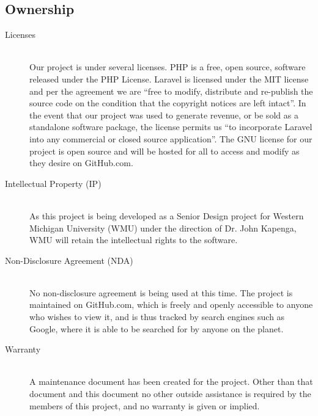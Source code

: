 \documentclass{report}
\begin{document}
\subsection*{Ownership}
\begin{description}
\item [Licenses] \hfill \\
Our project is under several licenses. PHP is a free, open source, software released under the PHP License. Laravel is licensed under the MIT license and per the agreement we are “free to modify, distribute and re-publish the source code on the condition that the copyright notices are left intact”. In the event that our project was used to generate revenue, or be sold as a standalone software package, the license permits us “to incorporate Laravel into any commercial or closed source application”. The GNU license for our project is open source and will be hosted for all to access and modify as they desire on GitHub.com.
\item [Intellectual Property (IP)] \hfill \\
As this project is being developed as a Senior Design project for Western Michigan University (WMU) under the direction of Dr. John Kapenga, WMU will retain the intellectual rights to the software.
\item [Non-Disclosure Agreement (NDA)] \hfill \\
No non-disclosure agreement is being used at this time. The project is maintained on GitHub.com, which is freely and openly accessible to anyone who wishes to view it, and is thus tracked by search engines such as Google, where it is able to be searched for by anyone on the planet.
\item [Warranty] \hfill \\
A maintenance document has been created for the project. Other than that document and this document no other outside assistance is required by the members of this project, and no warranty is given or implied.
\end{description}
\end{document}
